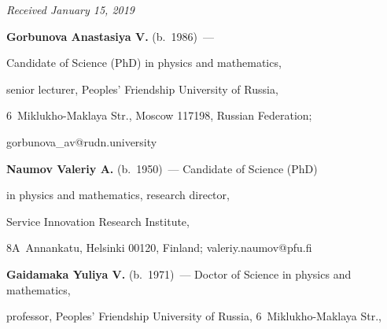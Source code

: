 \vspace*{-6pt}





\hfill{\small\textit{Received January 15, 2019}}















\Contr








\noindent


\textbf{Gorbunova Anastasiya V.} (b.\ 1986)~--- 


Candidate of Science (PhD) in physics and mathematics, 


senior lecturer, Peoples' Friendship University of Russia, 


6~Miklukho-Maklaya Str., Moscow 117198, Russian Federation; 


\mbox{gorbunova\_av@rudn.university}





\vspace*{3pt}








\noindent


\textbf{Naumov Valeriy A.} (b.\ 1950)~--- Candidate of Science (PhD) 


in physics and mathematics, research director, 


Service Innovation Research Institute, 


8A~Annankatu, Helsinki 00120, Finland; \mbox{valeriy.naumov@pfu.fi}





\vspace*{3pt}





\noindent


\textbf{Gaidamaka Yuliya V.} (b.\ 1971)~--- Doctor of Science in physics and mathematics, 


professor, Peoples' Friendship University of Russia, 6~Miklukho-Maklaya Str., 


